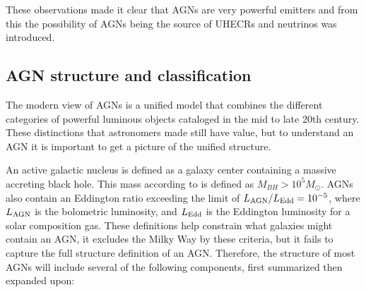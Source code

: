 These observations made it clear that AGNs are very powerful emitters and from this the possibility of AGNs being the source of UHECRs and neutrinos was introduced.



\subsection{AGN structure and classification}


The modern view of AGNs is a unified model that combines the different categories of powerful luminous objects cataloged in the mid to late 20th century. 
These distinctions that astronomers made still
have value, but to understand an AGN it is important to get a picture of the unified structure.

An active galactic nucleus is defined as a galaxy center containing a massive accreting black hole. This mass according to \cite{Netzer_2015} 
is defined as $M_{BH} > 10^5 M_\odot$. AGNs also contain an Eddington ratio exceeding
the limit of $L_{\rm AGN}/ L_{\rm Edd} = 10^{-5}$, where $L_{\rm AGN}$ is the bolometric luminosity, and $L_{\rm Edd}$ is the Eddington luminosity for a solar 
composition gas. These definitions help constrain what galaxies might contain an AGN, it excludes the Milky Way 
by these criteria, but it fails to capture the full structure definition of an AGN. 
Therefore, the structure of most AGNs will include several of the following components, first summarized then expanded upon: 



